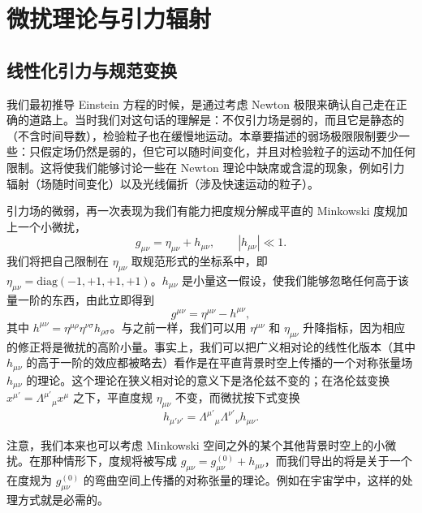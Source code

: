 
\chapter{微扰理论与引力辐射}

\section{线性化引力与规范变换}

我们最初推导 Einstein 方程的时候，是通过考虑 Newton 极限来确认自己走在正确的道路上。当时我们对这句话的理解是：不仅引力场是弱的，而且它是静态的（不含时间导数），检验粒子也在缓慢地运动。本章要描述的弱场极限限制要少一些：只假定场仍然是弱的，但它可以随时间变化，并且对检验粒子的运动不加任何限制。这将使我们能够讨论一些在 Newton 理论中缺席或含混的现象，例如引力辐射（场随时间变化）以及光线偏折（涉及快速运动的粒子）。

引力场的微弱，再一次表现为我们有能力把度规分解成平直的 Minkowski 度规加上一个小微扰，
\begin{equation*}
g_{\mu\nu} = \eta_{\mu\nu} + h_{\mu\nu}, \qquad |h_{\mu\nu}| \ll 1.
\tag{7.1}
\end{equation*}
我们将把自己限制在 $\eta_{\mu\nu}$ 取规范形式的坐标系中，即 $\eta_{\mu\nu} = \mathrm{diag}(-1,+1,+1,+1)$。$h_{\mu\nu}$ 是小量这一假设，使我们能够忽略任何高于该量一阶的东西，由此立即得到
\begin{equation*}
g^{\mu\nu} = \eta^{\mu\nu} - h^{\mu\nu},
\tag{7.2}
\end{equation*}
其中 $h^{\mu\nu} = \eta^{\mu\rho}\eta^{\nu\sigma}h_{\rho\sigma}$。与之前一样，我们可以用 $\eta^{\mu\nu}$ 和 $\eta_{\mu\nu}$ 升降指标，因为相应的修正将是微扰的高阶小量。事实上，我们可以把广义相对论的线性化版本（其中 $h_{\mu\nu}$ 的高于一阶的效应都被略去）看作是在平直背景时空上传播的一个对称张量场 $h_{\mu\nu}$ 的理论。这个理论在狭义相对论的意义下是洛伦兹不变的；在洛伦兹变换 $x^{\mu'} = \Lambda^{\mu'}{}_{\mu}x^{\mu}$ 之下，平直度规 $\eta_{\mu\nu}$ 不变，而微扰按下式变换
\begin{equation*}
h_{\mu'\nu'} = \Lambda^{\mu'}{}_{\mu}\Lambda^{\nu'}{}_{\nu}h_{\mu\nu}.
\tag{7.3}
\end{equation*}

注意，我们本来也可以考虑 Minkowski 空间之外的某个其他背景时空上的小微扰。在那种情形下，度规将被写成 $g_{\mu\nu} = g_{\mu\nu}^{(0)} + h_{\mu\nu}$，而我们导出的将是关于一个在度规为 $g_{\mu\nu}^{(0)}$ 的弯曲空间上传播的对称张量的理论。例如在宇宙学中，这样的处理方式就是必需的。

